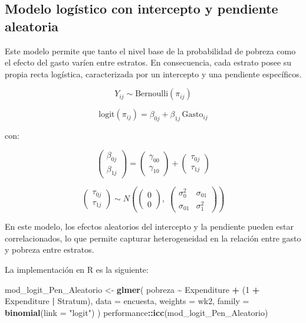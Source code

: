 \documentclass[
  spanish,
  12pt,
]{book}
\newenvironment{Shaded}{\begin{snugshade}}{\end{snugshade}}
\newcommand{\AttributeTok}[1]{\textcolor[rgb]{0.13,0.29,0.53}{#1}}
\newcommand{\DecValTok}[1]{\textcolor[rgb]{0.00,0.00,0.81}{#1}}
\newcommand{\FunctionTok}[1]{\textcolor[rgb]{0.13,0.29,0.53}{\textbf{#1}}}
\newcommand{\NormalTok}[1]{#1}
\newcommand{\OtherTok}[1]{\textcolor[rgb]{0.56,0.35,0.01}{#1}}
\newcommand{\SpecialCharTok}[1]{\textcolor[rgb]{0.81,0.36,0.00}{\textbf{#1}}}
\newcommand{\StringTok}[1]{\textcolor[rgb]{0.31,0.60,0.02}{#1}}
\begin{document}
\subsection{Modelo logístico con intercepto y pendiente aleatoria}\label{modelo-loguxedstico-con-intercepto-y-pendiente-aleatoria}

Este modelo permite que tanto el nivel base de la probabilidad de pobreza como el efecto del gasto varíen entre estratos. En consecuencia, cada estrato posee su propia recta logística, caracterizada por un intercepto y una pendiente específicos.

\[Y_{ij} \sim \text{Bernoulli}(\pi_{ij})\]

\[
\text{logit}(\pi_{ij}) = \beta_{0j} + \beta_{1j}\,\text{Gasto}_{ij}
\]

con:

\[
\begin{pmatrix}
\beta_{0j} \\
\beta_{1j}
\end{pmatrix}
=
\begin{pmatrix}
\gamma_{00} \\
\gamma_{10}
\end{pmatrix}
+
\begin{pmatrix}
\tau_{0j} \\
\tau_{1j}
\end{pmatrix}
\]

\[
\begin{pmatrix}
\tau_{0j} \\
\tau_{1j}
\end{pmatrix}
\sim
N\!\left(
\begin{pmatrix}
0 \\
0
\end{pmatrix},
\;
\begin{pmatrix}
\sigma^2_{0} & \sigma_{01} \\
\sigma_{01} & \sigma^2_{1}
\end{pmatrix}
\right)
\]

En este modelo, los efectos aleatorios del intercepto y la pendiente pueden estar correlacionados, lo que permite capturar heterogeneidad en la relación entre gasto y pobreza entre estratos.

La implementación en R es la siguiente:

\begin{Shaded}
\begin{Highlighting}[]
\NormalTok{mod\_logit\_Pen\_Aleatorio }\OtherTok{\textless{}{-}} \FunctionTok{glmer}\NormalTok{(}
\NormalTok{  pobreza }\SpecialCharTok{\textasciitilde{}}\NormalTok{ Expenditure }\SpecialCharTok{+}\NormalTok{ (}\DecValTok{1} \SpecialCharTok{+}\NormalTok{ Expenditure }\SpecialCharTok{|}\NormalTok{ Stratum),}
  \AttributeTok{data    =}\NormalTok{ encuesta,}
  \AttributeTok{weights =}\NormalTok{ wk2,}
  \AttributeTok{family  =} \FunctionTok{binomial}\NormalTok{(}\AttributeTok{link =} \StringTok{"logit"}\NormalTok{)}
\NormalTok{)}
\NormalTok{performance}\SpecialCharTok{::}\FunctionTok{icc}\NormalTok{(mod\_logit\_Pen\_Aleatorio)}
\end{Highlighting}
\end{Shaded}
\end{document}
